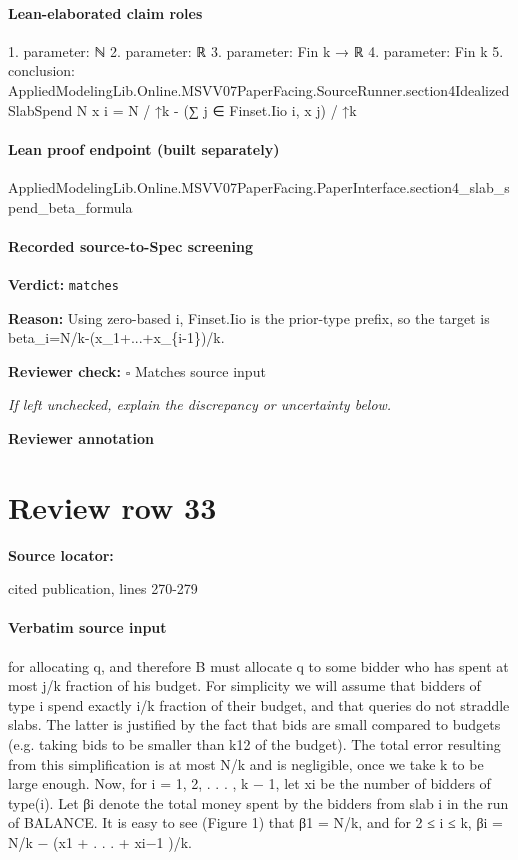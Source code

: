 \documentclass[10pt]{article}
\newcommand{\reviewerbox}{%
  \par\noindent\fbox{\parbox{0.96\linewidth}{\rule{0pt}{0.38in}}}\par
}
\newcommand{\reviewmatch}[1]{%
  \par\noindent\textbf{Reviewer check:} $\square$\; #1\par
  \noindent\emph{If left unchecked, explain the discrepancy or uncertainty below.}\par
}
\begin{document}
\paragraph{Lean-elaborated claim roles}\begin{ReviewVerbatim}
1. parameter: ℕ
2. parameter: ℝ
3. parameter: Fin k → ℝ
4. parameter: Fin k
5. conclusion: AppliedModelingLib.Online.MSVV07PaperFacing.SourceRunner.section4IdealizedSlabSpend N x i =
  N / ↑k - (∑ j ∈ Finset.Iio i, x j) / ↑k
\end{ReviewVerbatim}

\paragraph{Lean proof endpoint (built separately)}\begin{ReviewVerbatim}
AppliedModelingLib.Online.MSVV07PaperFacing.PaperInterface.section4_slab_spend_beta_formula
\end{ReviewVerbatim}

\paragraph{Recorded source-to-Spec screening}
\textbf{Verdict:} \texttt{matches}
\\
{\raggedright
\textbf{Reason:} Using zero-\allowbreak{}based i, Finset.\allowbreak{}Iio is the prior-\allowbreak{}type prefix, so the target is beta\_\allowbreak{}i=N/\allowbreak{}k-\allowbreak{}(x\_\allowbreak{}1+.\allowbreak{}.\allowbreak{}.\allowbreak{}+x\_\allowbreak{}\{i-\allowbreak{}1\})/\allowbreak{}k.\allowbreak{}
\par}
\reviewmatch{Matches source input}
\noindent\textbf{Reviewer annotation}\par
\reviewerbox
\clearpage
\hypertarget{source-claim-8b1a72efd54f0261}{}
\section*{Review row 33}
\textbf{Source locator:} {\footnotesize\raggedright cited publication, lines 270-\allowbreak{}279\par}
\paragraph{Verbatim source input}
\begin{ReviewVerbatim}
for allocating q, and therefore B must allocate q to some bidder who has spent at most j/k
fraction of his budget.
For simplicity we will assume that bidders of type i spend exactly i/k fraction of their budget,
and that queries do not straddle slabs. The latter is justified by the fact that bids are small
compared to budgets (e.g. taking bids to be smaller than k12 of the budget). The total error
resulting from this simplification is at most N/k and is negligible, once we take k to be large
enough. Now, for i = 1, 2, . . . , k − 1, let xi be the number of bidders of type(i). Let βi denote
the total money spent by the bidders from slab i in the run of BALANCE. It is easy to see
(Figure 1) that β1 = N/k, and for 2 ≤ i ≤ k, βi = N/k − (x1 + . . . + xi−1 )/k.
\end{ReviewVerbatim}
\end{document}
